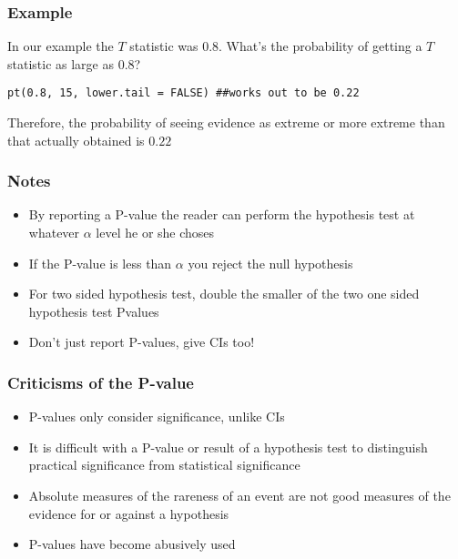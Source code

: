 \documentclass{beamer}
\begin{document}
\begin{frame}[fragile]\frametitle{Example} 
In our example the $T$ statistic was $0.8$. What's the probability of getting
a $T$ statistic as large as $0.8$?
\begin{verbatim}
pt(0.8, 15, lower.tail = FALSE) ##works out to be 0.22
\end{verbatim}
Therefore, the probability of seeing evidence as extreme or more
extreme than that actually obtained is $0.22$
\end{frame}

\begin{frame}\frametitle{Notes}
\begin{itemize}
\item By reporting a P-value the reader can perform the hypothesis
  test at whatever $\alpha$ level he or she choses
\item If the P-value is less than $\alpha$ you reject the null hypothesis 
\item For two sided hypothesis test, double the smaller of the two one
  sided hypothesis test Pvalues
\item Don't just report P-values, give CIs too!
\end{itemize}
\end{frame}

\begin{frame}\frametitle{Criticisms of the P-value}
\begin{itemize}
\item P-values only consider significance, unlike CIs
\item It is difficult with a P-value or result of a hypothesis test to
  distinguish practical significance from statistical significance
\item Absolute measures of the rareness of an event are not good
  measures of the evidence for or against a hypothesis
\item P-values have become abusively used
\end{itemize}
\end{frame}
\end{document}
